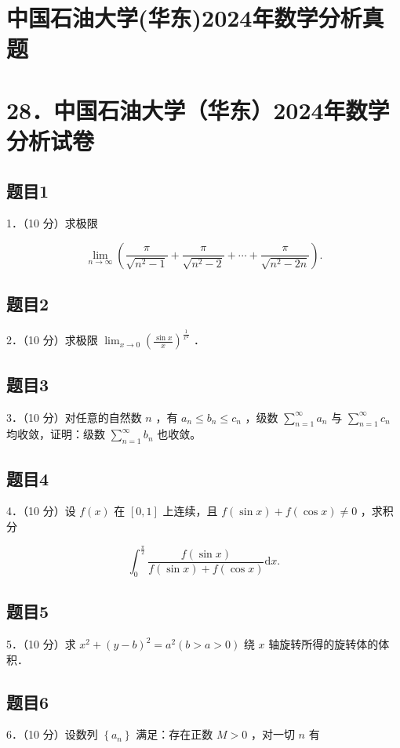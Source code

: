 \documentclass{article}
\begin{document}
\section*{中国石油大学(华东)2024年数学分析真题}
\section*{28．中国石油大学（华东）2024年数学分析试卷}

\subsection{题目1}
1．（10 分）求极限

\[
\lim _{n \rightarrow \infty}\left(\frac{\pi}{\sqrt{n^{2}-1}}+\frac{\pi}{\sqrt{n^{2}-2}}+\cdots+\frac{\pi}{\sqrt{n^{2}-2 n}}\right) .
\]

\subsection{题目2}
2．（10 分）求极限 \(\lim _{x \rightarrow 0}\left(\frac{\sin x}{x}\right)^{\frac{1}{x^{2}}}\) ．

\subsection{题目3}
3．（10 分）对任意的自然数 \(n\) ，有 \(a_{n} \leq b_{n} \leq c_{n}\) ，级数 \(\sum_{n=1}^{\infty} a_{n}\) 与 \(\sum_{n=1}^{\infty} c_{n}\) 均收敛，证明：级数 \(\sum_{n=1}^{\infty} b_{n}\) 也收敛。

\subsection{题目4}
4．（10 分）设 \(f(x)\) 在 \([0,1]\) 上连续，且 \(f(\sin x)+f(\cos x) \neq 0\) ，求积分

\[
\int_{0}^{\frac{\pi}{2}} \frac{f(\sin x)}{f(\sin x)+f(\cos x)} \mathrm{d} x .
\]

\subsection{题目5}
5．（10 分）求 \(x^{2}+(y-b)^{2}=a^{2}(b>a>0)\) 绕 \(x\) 轴旋转所得的旋转体的体积．

\subsection{题目6}
6．（10 分）设数列 \(\left\{a_{n}\right\}\) 满足：存在正数 \(M>0\) ，对一切 \(n\) 有
\end{document}
